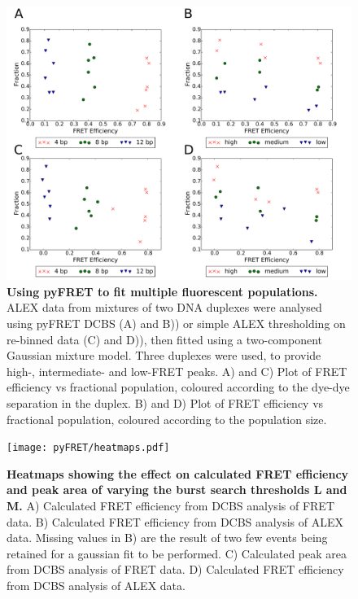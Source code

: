 \begin{figure}[!ht]
   \begin{center}
      \includegraphics*[clip=true, width=6in]{pyFRET/ratios.pdf}
      \caption{{\bf Using pyFRET to fit multiple fluorescent populations.} ALEX data from mixtures of two DNA duplexes were analysed using pyFRET DCBS (A) and B)) or simple ALEX thresholding on re-binned data (C) and D)), then fitted using a two-component Gaussian mixture model. Three duplexes were used, to provide high-, intermediate- and low-FRET peaks. A) and C) Plot of FRET efficiency vs fractional population, coloured according to the dye-dye separation in the duplex. B) and D) Plot of FRET efficiency vs fractional population, coloured according to the population size.}
      \label{fig:ratios}
   \end{center}
\end{figure}

\begin{figure}[!ht]
   \begin{center}
      \texttt{[image: pyFRET/heatmaps.pdf]}
      \caption{{\bf Heatmaps showing the effect on calculated FRET efficiency and peak area of varying the burst search thresholds L and M.} A) Calculated FRET efficiency from DCBS analysis of FRET data. B) Calculated FRET efficiency from DCBS analysis of ALEX data. Missing values in B) are the result of two few events being retained for a gaussian fit to be performed. C) Calculated peak area from DCBS analysis of FRET data. D) Calculated FRET efficiency from DCBS analysis of ALEX data.}
      \label{fig:fig8_heatmaps}
   \end{center}
\end{figure}

